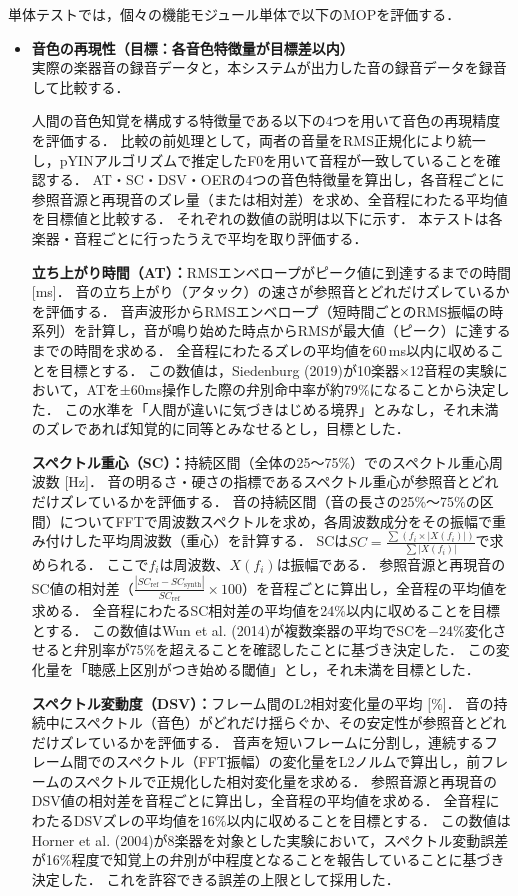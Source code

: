 \documentclass[lualatex,book,openany,paper=a4paper,jafontsize=11.5pt,jafontscale=1.05]{jlreq}
\begin{document}
単体テストでは，個々の機能モジュール単体で以下のMOPを評価する．

\begin{itemize}
    \item \textbf{音色の再現性（目標：各音色特徴量が目標差以内）} \\
    実際の楽器音の録音データと，本システムが出力した音の録音データを録音して比較する．

    人間の音色知覚を構成する特徴量である以下の4つを用いて音色の再現精度を評価する\cite{McAdams}．
    比較の前処理として，両者の音量をRMS正規化により統一し，pYINアルゴリズムで推定したF0を用いて音程が一致していることを確認する．
    AT・SC・DSV・OERの4つの音色特徴量を算出し，各音程ごとに参照音源と再現音のズレ量（または相対差）を求め、全音程にわたる平均値を目標値と比較する．
    それぞれの数値の説明は以下に示す．
    本テストは各楽器・音程ごとに行ったうえで平均を取り評価する．

    \textbf{立ち上がり時間（AT）：}RMSエンベロープがピーク値に到達するまでの時間 [ms]．
    音の立ち上がり（アタック）の速さが参照音とどれだけズレているかを評価する．
    音声波形からRMSエンベロープ（短時間ごとのRMS振幅の時系列）を計算し，音が鳴り始めた時点からRMSが最大値（ピーク）に達するまでの時間を求める．
    全音程にわたるズレの平均値を60\,ms以内に収めることを目標とする．
    この数値は，Siedenburg (2019)が10楽器×12音程の実験において，ATを±60ms操作した際の弁別命中率が約79\%になることから決定した\cite{Siedenburg}．
    この水準を「人間が違いに気づきはじめる境界」とみなし，それ未満のズレであれば知覚的に同等とみなせるとし，目標とした．

    \textbf{スペクトル重心（SC）：}持続区間（全体の25〜75\%）でのスペクトル重心周波数 [Hz]．
    音の明るさ・硬さの指標であるスペクトル重心が参照音とどれだけズレているかを評価する．
    音の持続区間（音の長さの25\%〜75\%の区間）についてFFTで周波数スペクトルを求め，各周波数成分をその振幅で重み付けした平均周波数（重心）を計算する．
    SCは$SC = \frac{\sum(f_i \times |X(f_i)|)} { \sum|X(f_i)|}$で求められる．
    ここで$f_i$は周波数、$X(f_i)$は振幅である．
    参照音源と再現音のSC値の相対差（$\frac{|SC_{\mathrm{ref}}-SC_{\mathrm{synth}}|}{SC_{\mathrm{ref}}}\times100$）を音程ごとに算出し，全音程の平均値を求める．
    全音程にわたるSC相対差の平均値を24\%以内に収めることを目標とする．
    この数値はWun et al. (2014)が複数楽器の平均でSCを−24\%変化させると弁別率が75\%を超えることを確認したことに基づき決定した\cite{Wun}．
    この変化量を「聴感上区別がつき始める閾値」とし，それ未満を目標とした．

    \textbf{スペクトル変動度（DSV）：}フレーム間のL2相対変化量の平均 [\%]．
    音の持続中にスペクトル（音色）がどれだけ揺らぐか、その安定性が参照音とどれだけズレているかを評価する．
    音声を短いフレームに分割し，連続するフレーム間でのスペクトル（FFT振幅）の変化量をL2ノルムで算出し，前フレームのスペクトルで正規化した相対変化量を求める．
    参照音源と再現音のDSV値の相対差を音程ごとに算出し，全音程の平均値を求める．
    全音程にわたるDSVズレの平均値を16\%以内に収めることを目標とする．
    この数値はHorner et al. (2004)が8楽器を対象とした実験において，スペクトル変動誤差が16\%程度で知覚上の弁別が中程度となることを報告していることに基づき決定した\cite{Horner}．
    これを許容できる誤差の上限として採用した．


\end{itemize}
\end{document}
